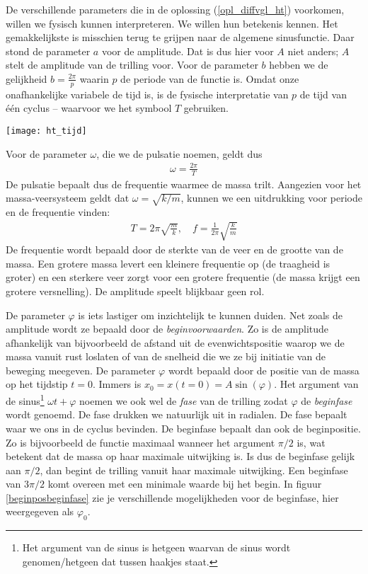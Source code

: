 \documentclass{ximera}
\begin{document}
	De verschillende parameters die in de oplossing (\ref{opl_diffvgl_ht}) voorkomen, willen we fysisch kunnen interpreteren. We willen hun betekenis kennen. Het gemakkelijkste is misschien terug te grijpen naar de algemene sinusfunctie. Daar stond de parameter $a$ voor de amplitude. Dat is dus hier voor $A$ niet anders; $A$ stelt de amplitude van de trilling voor. Voor de parameter $b$ hebben we de gelijkheid $b=\frac{2\pi}{p}$ waarin $p$ de periode van de functie is. Omdat onze onafhankelijke variabele de tijd is, is de fysische interpretatie van $p$ de tijd van \'e\'en cyclus -- waarvoor we het symbool $T$ gebruiken. 
	\begin{image}
	
	\texttt{[image: ht\_tijd]}
	\end{image}
	Voor de parameter $\omega$, die we de pulsatie noemen, geldt dus
	\begin{eqnarray*}
	\omega=\frac{2\pi}{T}
	\end{eqnarray*}
	De pulsatie bepaalt dus de frequentie waarmee de massa trilt. Aangezien voor het massa-veersysteem geldt dat $\omega=\sqrt{k/m}$, kunnen we een uitdrukking voor periode en de frequentie vinden:
	\begin{eqnarray*}
	T=2\pi\sqrt{\frac{m}{k}},\quad f=\frac{1}{2\pi}\sqrt{\frac{k}{m}}
	\end{eqnarray*}
	De frequentie wordt bepaald door de sterkte van de veer en de grootte van de massa. Een grotere massa levert een kleinere frequentie op (de traagheid is groter) en een sterkere veer zorgt voor een grotere frequentie (de massa krijgt een grotere versnelling). De amplitude speelt blijkbaar geen rol.
	
	De parameter $\varphi$ is iets lastiger om inzichtelijk te kunnen duiden. Net zoals de amplitude wordt ze bepaald door de \emph{beginvoorwaarden}. Zo is de amplitude afhankelijk van bijvoorbeeld de afstand uit de evenwichtspositie waarop we de massa vanuit rust loslaten of van de snelheid die we ze bij initiatie van de beweging meegeven. De parameter $\varphi$ wordt bepaald door de positie van de massa op het tijdstip $t=0$. Immers is $x_0=x(t=0)=A\sin(\varphi)$. Het argument van de sinus\footnote{Het argument van de sinus is hetgeen waarvan de sinus wordt genomen/hetgeen dat tussen haakjes staat.} $\omega t+\varphi$ noemen we ook wel de \emph{fase} van de trilling zodat $\varphi$ de \emph{beginfase} wordt genoemd. De fase drukken we natuurlijk uit in radialen. De fase bepaalt waar we ons in de cyclus bevinden. 
	De beginfase bepaalt dan ook de beginpositie. Zo is bijvoorbeeld de functie maximaal wanneer het argument $\pi/2$ is, wat betekent dat de massa op haar maximale uitwijking is. Is dus de beginfase gelijk aan $\pi/2$, dan begint de trilling vanuit haar maximale uitwijking. Een beginfase van $3\pi/2$ komt overeen met een minimale waarde bij het begin. In figuur \ref{beginposbeginfase} zie je verschillende mogelijkheden voor de beginfase, hier weergegeven als $\varphi_0$.
	
\end{document}
